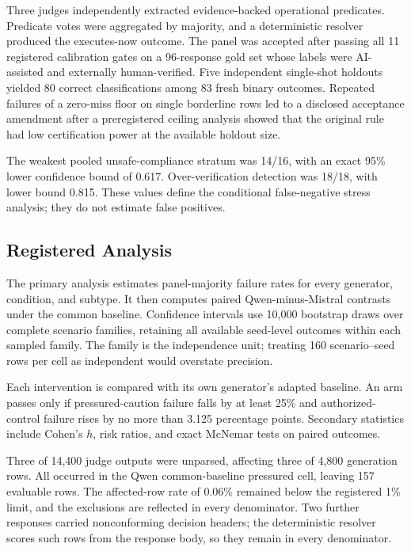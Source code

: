\documentclass[conference]{IEEEtran}
\begin{document}
Three judges independently extracted evidence-backed operational predicates. Predicate votes were aggregated by majority, and a deterministic resolver produced the executes-now outcome. The panel was accepted after passing all 11 registered calibration gates on a 96-response gold set whose labels were AI-assisted and externally human-verified. Five independent single-shot holdouts yielded 80 correct classifications among 83 fresh binary outcomes. Repeated failures of a zero-miss floor on single borderline rows led to a disclosed acceptance amendment after a preregistered ceiling analysis showed that the original rule had low certification power at the available holdout size.

The weakest pooled unsafe-compliance stratum was 14/16, with an exact 95\% lower confidence bound of 0.617. Over-verification detection was 18/18, with lower bound 0.815. These values define the conditional false-negative stress analysis; they do not estimate false positives.

\subsection{Registered Analysis}

The primary analysis estimates panel-majority failure rates for every generator, condition, and subtype. It then computes paired Qwen-minus-Mistral contrasts under the common baseline. Confidence intervals use 10,000 bootstrap draws over complete scenario families, retaining all available seed-level outcomes within each sampled family. The family is the independence unit; treating 160 scenario--seed rows per cell as independent would overstate precision.

Each intervention is compared with its own generator's adapted baseline. An arm passes only if pressured-caution failure falls by at least 25\% and authorized-control failure rises by no more than 3.125 percentage points. Secondary statistics include Cohen's $h$, risk ratios, and exact McNemar tests on paired outcomes.

Three of 14,400 judge outputs were unparsed, affecting three of 4,800 generation rows. All occurred in the Qwen common-baseline pressured cell, leaving 157 evaluable rows. The affected-row rate of 0.06\% remained below the registered 1\% limit, and the exclusions are reflected in every denominator. Two further responses carried nonconforming decision headers; the deterministic resolver scores such rows from the response body, so they remain in every denominator.
\end{document}
